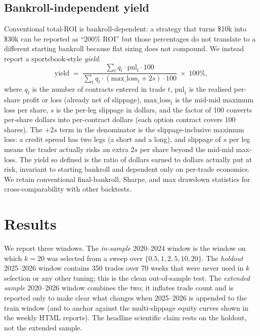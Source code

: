 \documentclass[11pt]{article}
\begin{document}
\subsection{Bankroll-independent yield}

Conventional total-ROI is bankroll-dependent: a strategy that
turns \$10k into \$30k can be reported as ``200\% ROI'' but those
percentages do not translate to a different starting bankroll because
flat sizing does not compound. We instead report a sportsbook-style
\emph{yield}:
\begin{equation}
    \text{yield} \;=\; \frac{\sum_t q_t \cdot \text{pnl}_t \cdot 100}
                          {\sum_t q_t \cdot (\text{max\_loss}_t + 2s) \cdot 100} \;\times\; 100\%,
\label{eq:yield}
\end{equation}
where $q_t$ is the number of contracts entered in trade $t$,
$\text{pnl}_t$ is the realised per-share profit or loss (already net
of slippage), $\text{max\_loss}_t$ is the mid-mid maximum loss
per share, $s$ is the per-leg slippage in dollars, and the factor of
100 converts per-share dollars into per-contract dollars (each option
contract covers 100 shares). The $+2s$ term in the denominator is the
slippage-inclusive maximum loss: a credit spread has two legs (a
short and a long), and slippage of $s$ per leg means the trader
actually risks an extra $2s$ per share beyond the mid-mid max-loss.
The yield so defined is the ratio of dollars earned to dollars
actually put at risk, invariant to starting bankroll and dependent
only on per-trade economics. We retain conventional final-bankroll,
Sharpe, and max drawdown statistics for cross-comparability with
other backtests.


\section{Results}\label{sec:results}

We report three windows. The \emph{in-sample} 2020--2024 window is the
window on which $k=20$ was selected from a sweep over $\{0.5, 1, 2, 5, 10, 20\}$.
The \emph{holdout} 2025--2026 window contains 350 trades over 70 weeks
that were never used in $k$ selection or any other tuning; this is the
clean out-of-sample test. The \emph{extended sample} 2020--2026 window
combines the two; it inflates trade count and is reported only to make
clear what changes when 2025--2026 is appended to the train window
(and to anchor against the multi-slippage equity curves shown in the
weekly HTML reports). The headline scientific claim rests on the
holdout, not the extended sample.
\end{document}
